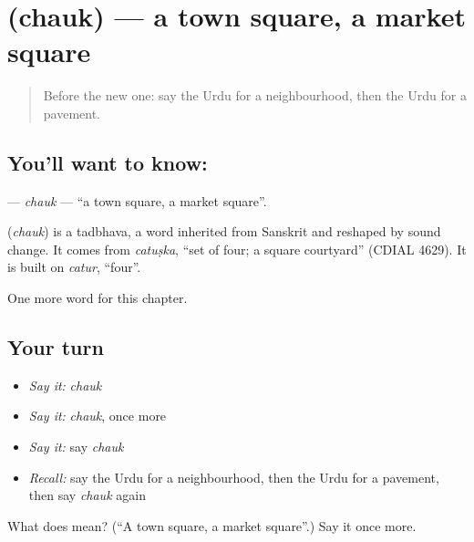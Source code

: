 \section[\texorpdfstring{\ur{چوک} (chauk)}{چوک (chauk)}]{ (chauk) — a town square, a market square}

\label{lesson:UR-C157-chauk}



\begin{quote}
Before the new one: say the Urdu for a neighbourhood, then the Urdu for a pavement.
\end{quote}

\subsection*{You'll want to know: }
\textbf{} — \emph{chauk} — \textquotedblleft{}a town square, a market square\textquotedblright{}.

\begin{cousinweb}
\textbf{} (\emph{chauk}) is a tadbhava, a word inherited from Sanskrit and reshaped by sound change. It comes from \emph{catuṣka}, \textquotedblleft{}set of four; a square courtyard\textquotedblright{} (CDIAL 4629). It is built on \emph{catur}, \textquotedblleft{}four\textquotedblright{}.
\end{cousinweb}

\begin{grammarlens}[title={What you've built}]
One more word for this chapter.
\end{grammarlens}

\subsection*{Your turn}
\begin{itemize}
\raggedright
  \item \emph{Say it:} \emph{chauk}
  \item \emph{Say it:} \emph{chauk}, once more
  \item \emph{Say it:} say \emph{chauk}
  \item \emph{Recall:} say the Urdu for a neighbourhood, then the Urdu for a pavement, then say \emph{chauk} again
\end{itemize}

\begin{tcolorbox}[breakable,colback=teal!4,colframe=teal!35!black,title={Before you move on}]
What does  mean? (\textquotedblleft{}A town square, a market square\textquotedblright{}.) Say it once more.
\end{tcolorbox}
